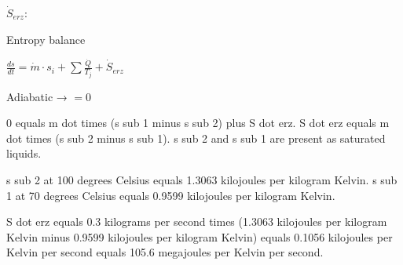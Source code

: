 \( \dot{S}_{erz} \):  

Entropy balance  

\( \frac{ds}{dt} = \dot{m} \cdot s_i + \sum \frac{\dot{Q}}{T_j} + \dot{S}_{erz} \)  

Adiabatic → \( = 0 \)

0 equals m dot times (s sub 1 minus s sub 2) plus S dot erz.  
S dot erz equals m dot times (s sub 2 minus s sub 1).  
s sub 2 and s sub 1 are present as saturated liquids.  

s sub 2 at 100 degrees Celsius equals 1.3063 kilojoules per kilogram Kelvin.  
s sub 1 at 70 degrees Celsius equals 0.9599 kilojoules per kilogram Kelvin.  

S dot erz equals 0.3 kilograms per second times (1.3063 kilojoules per kilogram Kelvin minus 0.9599 kilojoules per kilogram Kelvin) equals 0.1056 kilojoules per Kelvin per second equals 105.6 megajoules per Kelvin per second.